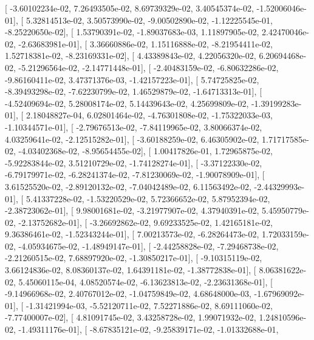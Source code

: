 \documentclass{article}
\begin{document}
       [ -3.60102234e-02,   7.26493505e-02,   8.69739329e-02,
          3.40545374e-02,  -1.52006046e-01],
       [  5.32814513e-02,   3.50573990e-02,  -9.00502890e-02,
         -1.12225545e-01,  -8.25220650e-02],
       [  1.53790391e-02,  -1.89037683e-03,   1.11897905e-02,
          2.42470046e-02,  -2.63683981e-01],
       [  3.36660886e-02,   1.15116888e-02,  -8.21954411e-02,
          1.52718381e-02,  -8.23169331e-02],
       [  4.43389843e-02,   4.22056320e-02,   6.20694468e-02,
         -5.21296564e-02,  -2.14771448e-01],
       [ -2.40483159e-02,  -6.80632286e-02,  -9.86160411e-02,
          3.47371376e-03,  -1.42157223e-01],
       [  5.74725825e-02,  -8.39493298e-02,  -7.62230799e-02,
          1.46529879e-02,  -1.64713313e-01],
       [ -4.52409694e-02,   5.28008174e-02,   5.14439643e-02,
          4.25699809e-02,  -1.39199283e-01],
       [  2.18048827e-04,   6.02801464e-02,  -4.76301808e-02,
         -1.75322033e-03,  -1.10344571e-01],
       [ -2.79676513e-02,  -7.84119965e-02,   3.80066374e-02,
          4.03259641e-02,  -2.12515282e-01],
       [ -3.60188259e-02,   6.46305902e-02,   1.71717585e-02,
         -4.03402368e-02,  -8.95654455e-02],
       [  1.00417826e-01,   1.72965875e-02,  -5.92283844e-02,
          3.51210729e-02,  -1.74128274e-01],
       [ -3.37122330e-02,  -6.79179971e-02,  -6.28241374e-02,
         -7.81230069e-02,  -1.90078909e-01],
       [  3.61525520e-02,  -2.89120132e-02,  -7.04042489e-02,
          6.11563492e-02,  -2.44329993e-01],
       [  5.41337228e-02,  -1.53220529e-02,   5.72366652e-02,
          5.87952394e-02,  -2.38723062e-01],
       [  9.98001681e-02,  -3.21977907e-02,   4.37940391e-02,
          5.45950779e-02,  -2.13752682e-01],
       [ -3.26692862e-02,   9.69233525e-02,   1.42165181e-02,
          9.36386461e-02,  -1.52343244e-01],
       [  7.00213573e-02,  -6.28264473e-02,   1.72033159e-02,
         -4.05934675e-02,  -1.48949147e-01],
       [ -2.44258828e-02,  -7.29468738e-02,  -2.21260515e-02,
          7.68897920e-02,  -1.30850217e-01],
       [ -9.10315119e-02,   3.66124836e-02,   8.08360137e-02,
          1.64391181e-02,  -1.38772838e-01],
       [  8.06381622e-02,   5.45060115e-04,   4.08520574e-02,
         -6.13623813e-02,  -2.23631368e-01],
       [ -9.14966968e-02,   2.40767012e-02,  -1.04759849e-02,
          4.68648000e-03,  -1.67969092e-01],
       [ -1.31421994e-03,  -5.52120711e-02,   7.52271886e-02,
          8.69111060e-02,  -7.77400007e-02],
       [  4.81091745e-02,   3.43258728e-02,   1.99071932e-02,
          1.24810596e-02,  -1.49311176e-01],
       [ -8.67835121e-02,  -9.25839171e-02,  -1.01332688e-01,
\end{document}
